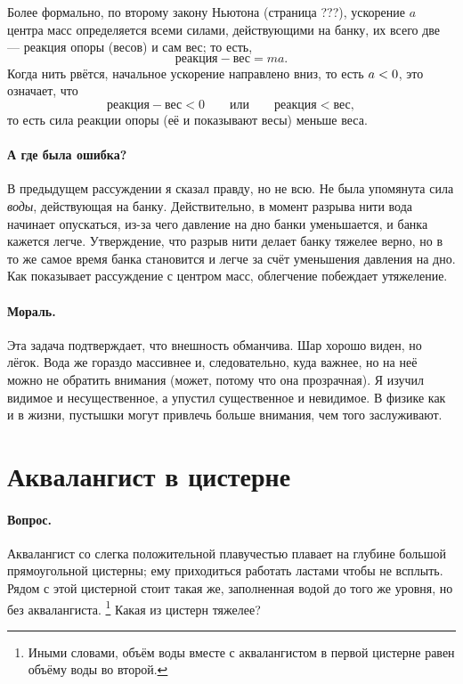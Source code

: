 Более формально, по второму закону Ньютона (страница ???), ускорение $a$ центра масс определяется всеми силами, действующими на банку, их всего две --- реакция опоры (весов) и сам вес; то есть,
\[\text{реакция}-\text{вес}=ma.\]
Когда нить рвётся, начальное ускорение направлено вниз, то есть $a\z<0$, это означает, что
\[
\text{реакция}-\text{вес}<0
\qquad\text{или}\qquad
\text{реакция}<\text{вес},
\]
то есть сила реакции опоры (её и показывают весы) меньше веса.

\paragraph{А где была ошибка?}
В предыдущем рассуждении я сказал правду, но не всю.
Не была упомянута сила \emph{воды}, действующая на банку.
Действительно, в момент разрыва нити вода начинает опускаться, из-за чего давление на дно банки уменьшается, и банка кажется легче.
Утверждение, что разрыв нити делает банку тяжелее верно, но в то же самое время банка становится и легче за счёт уменьшения давления на дно.
Как показывает рассуждение с центром масс, облегчение побеждает утяжеление.

\paragraph{Мораль.}
Эта задача подтверждает, что внешность обманчива.
Шар хорошо виден, но лёгок.
Вода же гораздо массивнее и, следовательно, куда важнее, но на неё можно не обратить внимания (может, потому что она прозрачная).
Я изучил видимое и несущественное, а упустил существенное и невидимое.
В физике как и в жизни, пустышки могут привлечь больше внимания, чем того заслуживают.

\section{Аквалангист в цистерне}

\paragraph{Вопрос.}
Аквалангист со слегка положительной плавучестью плавает на глубине большой прямоугольной цистерны; ему приходиться работать ластами чтобы не всплыть.
Рядом с этой цистерной стоит такая же, заполненная водой до того же уровня, но без аквалангиста.%
\footnote{Иными словами, объём воды вместе с аквалангистом в первой цистерне равен объёму воды во второй.}
Какая из цистерн тяжелее?

